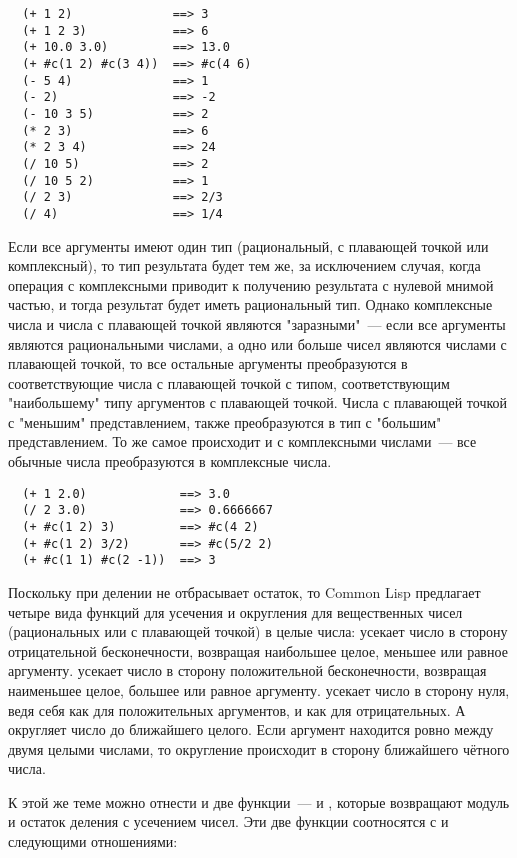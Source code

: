 \begin{verbatim}
  (+ 1 2)              ==> 3
  (+ 1 2 3)            ==> 6
  (+ 10.0 3.0)         ==> 13.0
  (+ #c(1 2) #c(3 4))  ==> #c(4 6)
  (- 5 4)              ==> 1
  (- 2)                ==> -2
  (- 10 3 5)           ==> 2
  (* 2 3)              ==> 6
  (* 2 3 4)            ==> 24
  (/ 10 5)             ==> 2
  (/ 10 5 2)           ==> 1
  (/ 2 3)              ==> 2/3
  (/ 4)                ==> 1/4
\end{verbatim}

Если все аргументы имеют один тип (рациональный, с плавающей точкой или комплексный), то
тип результата будет тем же, за исключением случая, когда операция с комплексными приводит
к получению результата с нулевой мнимой частью, и тогда результат будет иметь рациональный
тип.  Однако комплексные числа и числа с плавающей точкой являются "заразными"~--- если все
аргументы являются рациональными числами, а одно или больше чисел являются числами с
плавающей точкой, то все остальные аргументы преобразуются в соответствующие числа с
плавающей точкой с типом, соответствующим "наибольшему" типу аргументов с плавающей
точкой.  Числа с плавающей точкой с "меньшим" представлением, также преобразуются в тип с
"большим" представлением.  То же самое происходит и с комплексными числами~--- все обычные
числа преобразуются в комплексные числа.

\begin{verbatim}
  (+ 1 2.0)             ==> 3.0
  (/ 2 3.0)             ==> 0.6666667
  (+ #c(1 2) 3)         ==> #c(4 2)
  (+ #c(1 2) 3/2)       ==> #c(5/2 2)
  (+ #c(1 1) #c(2 -1))  ==> 3
\end{verbatim}

Поскольку \code{/} при делении не отбрасывает остаток, то Common Lisp предлагает четыре
вида функций для усечения и округления для вещественных чисел (рациональных или с
плавающей точкой) в целые числа:  усекает число в сторону отрицательной
бесконечности, возвращая наибольшее целое, меньшее или равное аргументу. 
усекает число в сторону положительной бесконечности, возвращая наименьшее целое, большее
или равное аргументу.  усекает число в сторону нуля, ведя себя как
 для положительных аргументов, и как  для отрицательных.  А
 округляет число до ближайшего целого. Если аргумент находится ровно между
двумя целыми числами, то округление происходит в сторону ближайшего чётного числа.

К этой же теме можно отнести и две функции~---  и , которые возвращают
модуль и остаток деления с усечением чисел.  Эти две функции соотносятся с  и
 следующими отношениями:
  
